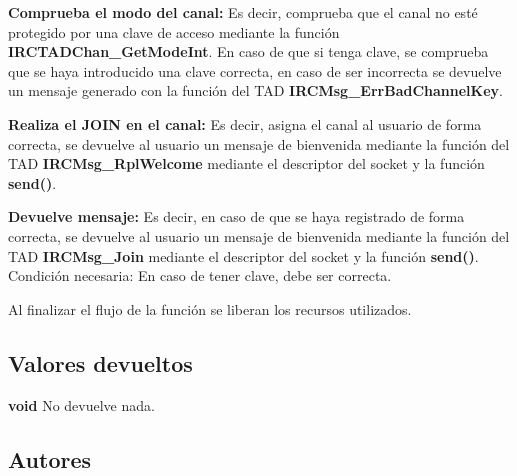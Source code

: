 \begin{DoxyItemize}
\item {\bfseries Comprueba el modo del canal\+:} Es decir, comprueba que el canal no esté protegido por una clave de acceso mediante la función {\bfseries I\+R\+C\+T\+A\+D\+Chan\+\_\+\+Get\+Mode\+Int}. En caso de que si tenga clave, se comprueba que se haya introducido una clave correcta, en caso de ser incorrecta se devuelve un mensaje generado con la función del T\+AD {\bfseries I\+R\+C\+Msg\+\_\+\+Err\+Bad\+Channel\+Key}.  
\item {\bfseries Realiza el J\+O\+IN en el canal\+:} Es decir, asigna el canal al usuario de forma correcta, se devuelve al usuario un mensaje de bienvenida mediante la función del T\+AD {\bfseries I\+R\+C\+Msg\+\_\+\+Rpl\+Welcome} mediante el descriptor del socket y la función {\bfseries send()}. 
\item {\bfseries Devuelve mensaje\+:} Es decir, en caso de que se haya registrado de forma correcta, se devuelve al usuario un mensaje de bienvenida mediante la función del T\+AD {\bfseries I\+R\+C\+Msg\+\_\+\+Join} mediante el descriptor del socket y la función {\bfseries send()}. ~\newline
Condición necesaria\+: En caso de tener clave, debe ser correcta.  
\end{DoxyItemize}

Al finalizar el flujo de la función se liberan los recursos utilizados.\hypertarget{server_command_join_return_join}{}\subsection{Valores devueltos}\label{server_command_join_return_join}

\begin{DoxyItemize}
\item {\bfseries void} No devuelve nada. 
\end{DoxyItemize}\hypertarget{server_command_join_authors_join}{}\subsection{Autores}\label{server_command_join_authors_join}

